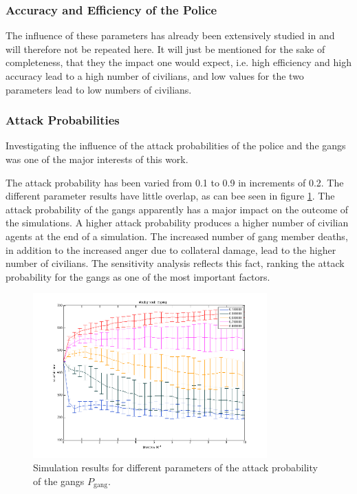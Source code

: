 \documentclass[11pt]{article}
\begin{document}
\subsubsection{Accuracy and Efficiency of the Police}
The influence of these parameters has already been extensively studied in \cite{bennett, kouzoupis} and will therefore not be repeated here. It will just be mentioned for the sake of completeness, that they the impact one would expect, i.e. high efficiency and high accuracy lead to a high number of civilians, and low values for the two parameters lead to low numbers of civilians.


\subsubsection{Attack Probabilities}
Investigating the influence of the attack probabilities of the police and the gangs was one of the major interests of this work.


The attack probability has been varied from 0.1 to 0.9 in increments of 0.2. The different parameter results have little overlap, as can bee seen in figure \ref{attackprobgang}.
The attack probability of the gangs apparently has a major impact on the outcome of the simulations. A higher attack probability produces a higher number of civilian agents at the end of a simulation. The increased number of gang member deaths, in addition to the increased anger due to collateral damage, lead to the higher number of civilians. The sensitivity analysis reflects this fact, ranking the attack probability for the gangs as one of the most important factors. 

\begin{figure}[h!]
	\centering
	\includegraphics[width=9cm]{attackprobgang.png}
   \caption{Simulation results for different parameters of the attack probability of the gangs $P_{\text{gang}}$. }\label{attackprobgang}
\end{figure}
\end{document}
